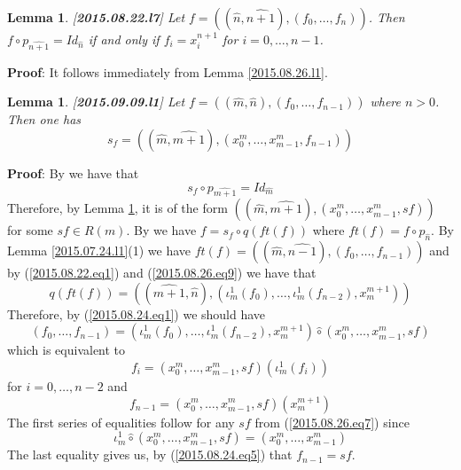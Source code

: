 \documentclass[11pt]{article}
\newenvironment{proof}{{\bf Proof}:}{\vskip 5mm }
\newtheorem{lemma}[proposition]{Lemma}
\newcommand{\llabel}[1]{\label{#1}[{\bf #1}]}
\newcommand{\wh}{\widehat}
\newcommand{\hc}{\wh{\circ}}
\begin{document}
%
\begin{lemma}
\llabel{2015.08.22.l7}
Let $f=((\wh{n},\wh{n+1}),(f_0,\dots,f_n))$. Then $f\circ p_{\wh{n+1}}=Id_{\wh{n}}$ if and only if $f_i=x_i^{n+1}$ for $i=0,\dots,n-1$.
\end{lemma}
%
\begin{proof}
It follows immediately from Lemma \ref{2015.08.26.l1}.
\end{proof}
%
\begin{lemma}
\llabel{2015.09.09.l1}
Let $f=((\wh{m},\wh{n}),(f_0,\dots,f_{n-1}))$ where $n>0$. Then one has
%
$$s_f=((\wh{m},\wh{m+1}),(x_0^m,\dots,x_{m-1}^m,f_{n-1}))$$
%
\end{lemma}
%
\begin{proof}
By \cite[Definition 2.3(2)]{Csubsystems} we have that 
%
$$s_f\circ p_{\wh{m+1}}=Id_{\wh{m}}$$
%
Therefore, by Lemma \ref{2015.08.22.l7}, it is of the form $((\wh{m},\wh{m+1}),(x_0^m,\dots,x_{m-1}^m,sf))$ for some $sf\in R(m)$. By \cite[Definition 2.3(3)]{Csubsystems} we have $f=s_f\circ q(ft(f))$ where $ft(f)=f\circ p_{\wh{n}}$. By Lemma \ref{2015.07.24.l1}(1) we have $ft(f)=((\wh{m},\wh{n-1}),(f_0,\dots,f_{n-1}))$ and by (\ref{2015.08.22.eq1}) and (\ref{2015.08.26.eq9}) we have that 
%
$$q(ft(f))=((\wh{m+1},\wh{n}),(\iota_m^1(f_0),\dots,\iota_m^1(f_{n-2}),x_{m}^{m+1}))$$
%
Therefore, by (\ref{2015.08.24.eq1}) we should have
%
$$(f_0,\dots,f_{n-1})=(\iota_m^1(f_0),\dots,\iota_m^1(f_{n-2}),x_{m}^{m+1})\hc (x_0^m,\dots,x_{m-1}^m,sf)$$
%
which is equivalent to 
%
$$f_i=(x_0^m,\dots,x_{m-1}^m,sf)(\iota_m^1(f_i))$$
%
for $i=0,\dots,n-2$ and 
%
$$f_{n-1}=(x_0^m,\dots,x_{m-1}^m,sf)(x_{m}^{m+1})$$
%
The first series of equalities follow for any $sf$ from (\ref{2015.08.26.eq7}) since 
%
$$\iota_m^1\hc (x_0^m,\dots,x_{m-1}^m,sf)=(x_0^m,\dots,x_{m-1}^m)$$
%
The last equality gives us, by (\ref{2015.08.24.eq5}) that $f_{n-1}=sf$.
\end{proof}
%
\end{document}

